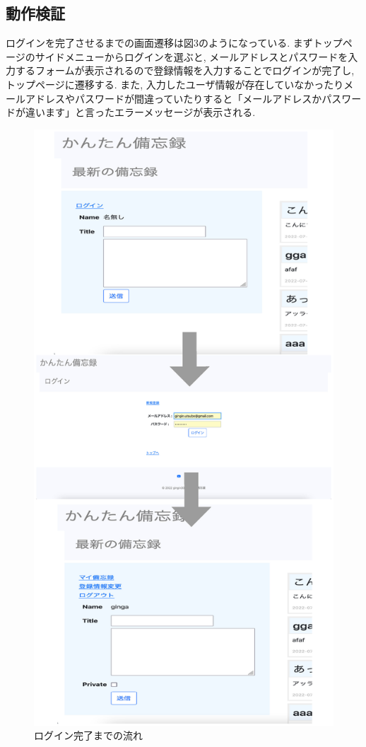 \documentclass[submit,techrep]{ipsj}
\begin{document}
\subsection{動作検証}
ログインを完了させるまでの画面遷移は図3のようになっている. まずトップページのサイドメニューからログインを選ぶと, メールアドレスとパスワードを入力するフォームが表示されるので登録情報を入力することでログインが完了し, トップページに遷移する. 
また, 入力したユーザ情報が存在していなかったりメールアドレスやパスワードが間違っていたりすると「メールアドレスかパスワードが違います」と言ったエラーメッセージが表示される. 
\begin{figure}[h]
 \centering
 \includegraphics[scale=0.17]{toLogin.eps}
\caption{ログイン完了までの流れ}
 \label{ログインまで}
\end{figure}
\end{document}
